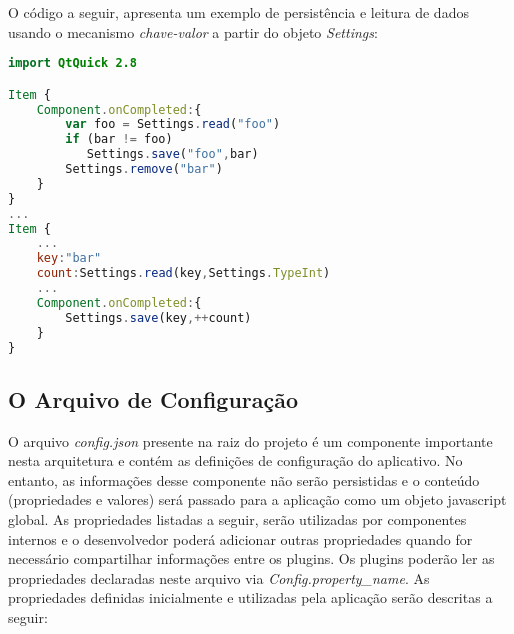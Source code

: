 O código a seguir, apresenta um exemplo de persistência e leitura de dados usando o mecanismo \textit{chave-valor} a partir do objeto \textit{Settings}:

\begin{center}
\begin{lstlisting}[language=qml]
import QtQuick 2.8

Item {
    Component.onCompleted:{
		var foo = Settings.read("foo")
		if (bar != foo)
		   Settings.save("foo",bar)
		Settings.remove("bar")
    }
}
...
Item {
	...
	key:"bar"
	count:Settings.read(key,Settings.TypeInt)
	...
	Component.onCompleted:{ 
		Settings.save(key,++count)
	}
}
\end{lstlisting}
\end{center}


\subsection{O Arquivo de Configuração}\label{sec:solucao-desenvolvida}
O arquivo \textit{config.json} presente na raiz do projeto é um componente importante nesta arquitetura e contém as definições de configuração do aplicativo. No entanto, as informações desse componente não serão persistidas e o conteúdo (propriedades e valores) será passado para a aplicação como um objeto javascript global. As propriedades listadas a seguir, serão utilizadas por componentes internos e o desenvolvedor poderá adicionar outras propriedades quando for necessário compartilhar informações entre os plugins. Os plugins poderão ler as propriedades declaradas neste arquivo via \textit{Config.property\_name}. As propriedades definidas inicialmente e utilizadas pela aplicação serão descritas a seguir:

